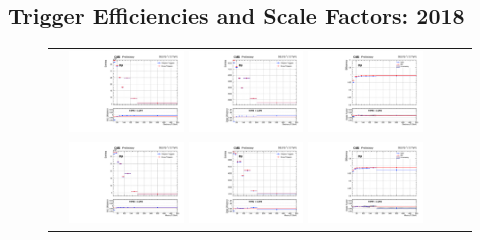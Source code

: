 \clearpage
\subsection{Trigger Efficiencies and Scale Factors: 2018}
\label{TrigSFResults2018}

\begin{figure}[!htb]
  \begin{center}
    \begin{tabular}{ccc}
      \includegraphics[width=0.30\textwidth]{fig_2018_TrigSF/g_lepApt_emu_MC.pdf}
      \includegraphics[width=0.30\textwidth]{fig_2018_TrigSF/g_lepApt_emu_data.pdf}
      \includegraphics[width=0.30\textwidth]{fig_2018_TrigSF/g_emu_lepApt_FullSystUncBand.pdf}\\
      \includegraphics[width=0.30\textwidth]{fig_2018_TrigSF/g_lepBpt_emu_MC.pdf}
      \includegraphics[width=0.30\textwidth]{fig_2018_TrigSF/g_lepBpt_emu_data.pdf}
      \includegraphics[width=0.30\textwidth]{fig_2018_TrigSF/g_emu_lepBpt_FullSystUncBand.pdf}\\

\end{tabular}
\end{center}
\end{figure}
